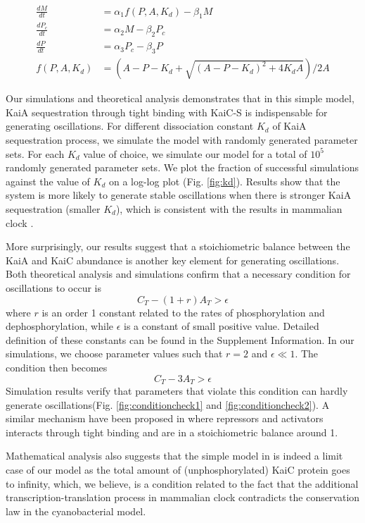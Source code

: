 \documentclass[a4paper,10pt]{article}
\numberwithin{equation}{section}
\begin{document}
\begin{equation}\label{eq:jae_s} 
\begin{aligned}
\frac{dM}{dt}&=\alpha_1 f(P,A,K_d)-\beta_1 M\\
\frac{dP_c}{dt}&=\alpha_2M-\beta_2 P_c\\
\frac{dP}{dt}&=\alpha_3 P_c-\beta_3 P\\
 f(P,A,K_d)&=\left(A-P-K_d+\sqrt{(A-P-K_d)^2+4K_dA}\right)/2A 
\end{aligned}
\end{equation}

Our simulations and theoretical analysis demonstrates that in this simple model, KaiA sequestration through tight binding with KaiC-S is indispensable for generating oscillations. For different dissociation constant $K_d$ of KaiA sequestration process, we simulate the model with randomly generated parameter sets. For each $K_d$ value of choice, we simulate our model for a total of  $10^5$ randomly generated parameter sets. We plot the fraction of successful simulations against the value of $K_d$ on a log-log plot (Fig. \ref{fig:kd}). Results show that the system is more likely to generate stable oscillations when there is stronger KaiA sequestration (smaller $K_d$), which is consistent with the results in mammalian clock \citet{forger2012}.    




More surprisingly, our results suggest that a stoichiometric balance between the KaiA and KaiC abundance is another key element for generating oscillations. Both theoretical analysis and simulations confirm that a necessary condition for oscillations to occur is \[C_T-(1+r)A_T>\epsilon\] where $r$ is an order 1 constant related to the rates of phosphorylation and dephosphorylation, while $\epsilon$ is a constant of small positive value. Detailed definition of these constants can be found in the Supplement Information. In our simulations, we choose parameter values such that $r=2$ and $\epsilon\ll 1$. The condition then becomes \[C_T-3A_T>\epsilon\] Simulation results verify that parameters that violate this condition can hardly generate oscillations(Fig. \ref{fig:conditioncheck1} and  \ref{fig:conditioncheck2}). A similar mechanism have been proposed in \citet{forger2012} where repressors and activators interacts through tight binding and are in a stoichiometric balance around 1. 




Mathematical analysis also suggests that the simple model in \citet{forger2012} is indeed a limit case of our model as the total amount of (unphosphorylated) KaiC protein goes to infinity, which, we believe, is a condition related to the fact that the additional transcription-translation process in mammalian clock contradicts the conservation law in the cyanobacterial model. 
\end{document}
